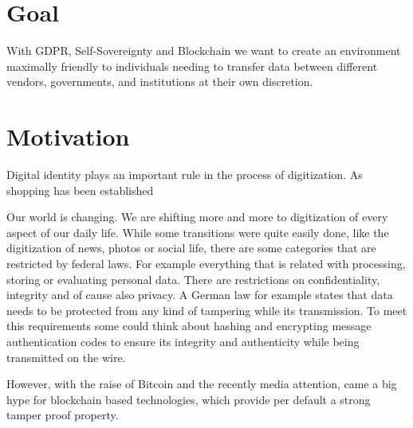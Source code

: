 \section{Goal}
With GDPR, Self-Sovereignty and Blockchain we want to create an environment maximally friendly to individuals needing to transfer data between different vendors, governments, and institutions at their own discretion.	
	


\section{Motivation}
Digital identity plays an important rule in the process of digitization. As shopping has been established

Our world is changing. We are shifting more and more to digitization of every aspect of our daily life.
While some transitions were quite easily done, like the digitization of news, photos or social life,
there are some categories that are restricted by federal laws. For example everything that is related with processing,
storing or evaluating personal data. There are restrictions on confidentiality, integrity and of cause also privacy.
A German law for example states that data needs to be protected from any kind of tampering while its transmission.
To meet this requirements some could think about hashing and encrypting message authentication codes to ensure its
integrity and authenticity while being transmitted on the wire.

However, with the raise of Bitcoin and the recently media attention, came a big hype for blockchain based technologies,
which provide per default a strong tamper proof property.
